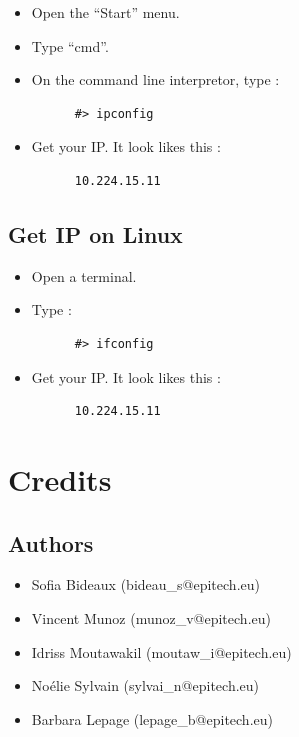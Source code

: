 \documentclass{koala-fr}
\begin{document}
\begin{itemize}
  \item Open the ``Start'' menu.
  \item Type ``cmd''.
  \item On the command line interpretor, type :
    \begin{lstlisting}
      #> ipconfig
    \end{lstlisting}    
  \item Get your IP. It look likes this :
    \begin{lstlisting}
      10.224.15.11
    \end{lstlisting}    
\end{itemize}

\section{Get IP on Linux}

\begin{itemize}
  \item Open a terminal.
  \item Type :
    \begin{lstlisting}
      #> ifconfig
    \end{lstlisting}    
  \item Get your IP. It look likes this :
    \begin{lstlisting}
      10.224.15.11
    \end{lstlisting}    
\end{itemize}


\chapter{ Credits}

\section{ Authors}

\begin{itemize}
  \item Sofia Bideaux (bideau\_s@epitech.eu)
  \item Vincent Munoz (munoz\_v@epitech.eu)
  \item Idriss Moutawakil (moutaw\_i@epitech.eu)
  \item Noélie Sylvain (sylvai\_n@epitech.eu)
  \item Barbara Lepage (lepage\_b@epitech.eu)
\end{itemize}
\end{document}
